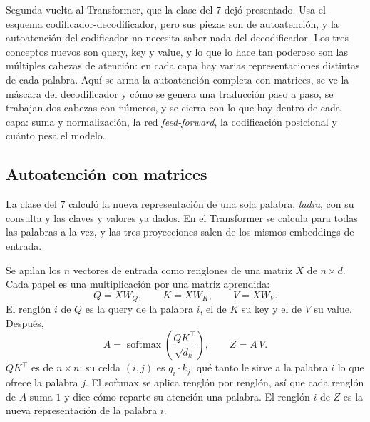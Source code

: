 \documentclass[11pt,letterpaper]{article}
\begin{document}
\newpage


\begin{quick_sum}
    Segunda vuelta al Transformer, que la clase del $7$ dejó
    presentado. Usa el esquema codificador-decodificador, pero sus
    piezas son de autoatención, y la autoatención del codificador no
    necesita saber nada del decodificador. Los tres conceptos nuevos
    son query, key y value, y lo que lo hace tan poderoso son las
    múltiples cabezas de atención: en cada capa hay varias
    representaciones distintas de cada palabra. Aquí se arma la
    autoatención completa con matrices, se ve la máscara del
    decodificador y cómo se genera una traducción paso a paso, se
    trabajan dos cabezas con números, y se cierra con lo que hay
    dentro de cada capa: suma y normalización, la red
    \textit{feed-forward}, la codificación posicional y cuánto pesa el
    modelo.
\end{quick_sum}

\subsection*{Autoatención con matrices}

La clase del $7$ calculó la nueva representación de una sola palabra,
\textit{ladra}, con su consulta y las claves y valores ya dados. En el
Transformer se calcula para todas las palabras a la vez, y las tres
proyecciones salen de los mismos embeddings de entrada.

Se apilan los $n$ vectores de entrada como renglones de una matriz $X$
de $n \times d$. Cada papel es una multiplicación por una matriz
aprendida:
\[
    Q = X W_Q , \qquad K = X W_K , \qquad V = X W_V .
\]
El renglón $i$ de $Q$ es la query de la palabra $i$, el de $K$ su key y
el de $V$ su value. Después,
\[
    A = \operatorname{softmax}\!\left(\frac{Q K^{\top}}{\sqrt{d_k}}
        \right) ,
    \qquad
    Z = A\, V .
\]
$Q K^{\top}$ es de $n \times n$: su celda $(i, j)$ es $q_i \cdot k_j$,
qué tanto le sirve a la palabra $i$ lo que ofrece la palabra $j$. El
softmax se aplica renglón por renglón, así que cada renglón de $A$
suma $1$ y dice cómo reparte su atención una palabra. El renglón $i$
de $Z$ es la nueva representación de la palabra $i$.
\end{document}
